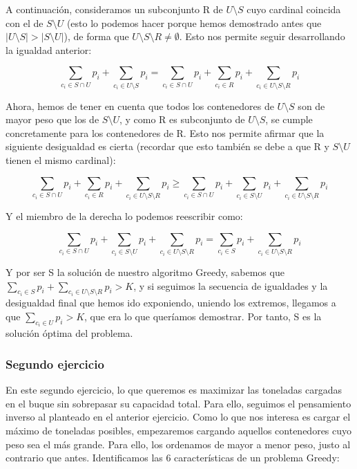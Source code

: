 \documentclass[10pt,a4paper]{article}
\begin{document}
\begin{itemize}
	A continuación, consideramos un subconjunto R de $U \setminus S$ cuyo cardinal coincida con el de $S \setminus U$ (esto lo podemos hacer porque hemos demostrado antes que $|U \setminus S| > |S \setminus U|$), de forma que $U \setminus S \setminus R \neq \emptyset$. Esto nos permite seguir desarrollando la igualdad anterior:
	
	\[
	\sum_{c_{i} \in S \cap U}p_{i} + \sum_{c_{i} \in U \setminus S}p_{i} = \sum_{c_{i} \in S \cap U}p_{i} + \sum_{c_{i} \in R}p_{i} + \sum_{c_{i} \in U \setminus S \setminus R}p_{i}
	\]
	
	Ahora, hemos de tener en cuenta que todos los contenedores de $U \setminus S$ son de mayor peso que los de $S \setminus U$, y como R es subconjunto de $U \setminus S$, se cumple concretamente para los contenedores de R. Esto nos permite afirmar que la siguiente desigualdad es cierta (recordar que esto también se debe a que R y $S \setminus U$ tienen el mismo cardinal):
	
	\[
	\sum_{c_{i} \in S \cap U}p_{i} + \sum_{c_{i} \in R}p_{i} + \sum_{c_{i} \in U \setminus S \setminus R}p_{i} \geq \sum_{c_{i} \in S \cap U}p_{i} + \sum_{c_{i} \in S \setminus U}p_{i} + \sum_{c_{i} \in U \setminus S \setminus R}p_{i}
	\]
	
	Y el miembro de la derecha lo podemos reescribir como:
	
	\[
	\sum_{c_{i} \in S \cap U}p_{i} + \sum_{c_{i} \in S \setminus U}p_{i} + \sum_{c_{i} \in U \setminus S \setminus R}p_{i} = \sum_{c_{i} \in S}p_{i} + \sum_{c_{i} \in U \setminus S \setminus R}p_{i}
	\]
	
	Y por ser S la solución de nuestro algoritmo Greedy, sabemos que $\sum_{c_{i} \in S}p_{i} + \sum_{c_{i} \in U \setminus S \setminus R}p_{i} > K$, y si seguimos la secuencia de igualdades y la desigualdad final que hemos ido exponiendo, uniendo los extremos, llegamos a que $\sum_{c_{i} \in U}p_{i} > K$, que era lo que queríamos demostrar. Por tanto, S es la solución óptima del problema.
\end{itemize}
	
\subsubsection{Segundo ejercicio}

	En este segundo ejercicio, lo que queremos es maximizar las toneladas cargadas en el buque sin sobrepasar su capacidad total. Para ello, seguimos el pensamiento inverso al planteado en el anterior ejercicio. Como lo que nos interesa es cargar el máximo de toneladas posibles, empezaremos cargando aquellos contenedores cuyo peso sea el más grande. Para ello, los ordenamos de mayor a menor peso, justo al contrario que antes. Identificamos las 6 características de un problema Greedy:
	
\end{document}
